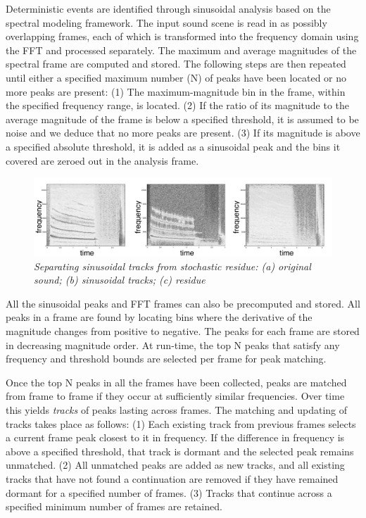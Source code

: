 \documentclass[twoside]{article}
\begin{document}
Deterministic events are identified through sinusoidal analysis based on the 
spectral modeling framework. The input sound scene is read in as possibly overlapping 
frames, each of which is transformed into the frequency domain using the 
FFT and processed separately. The maximum and average 
magnitudes of the spectral frame are computed and stored. The following 
steps are then repeated until either a specified maximum number (N) of peaks 
have been located or no more peaks are present:
(1) The maximum-magnitude bin in the frame, within the specified frequency range, is 
located. 
(2) If the ratio of its magnitude to the average magnitude of the frame is 
below a specified threshold, it is assumed to be noise and we deduce that no 
more peaks are present. 
(3) If its magnitude is above a specified absolute threshold, it is added as a 
sinusoidal peak and the bins it covered are zeroed out in the analysis frame.
\begin{figure}[t]
\setlength\textfloatsep{0pt}
\setlength\abovecaptionskip{0pt}
\setlength\belowcaptionskip{0pt}
\centering
   \includegraphics[width=.48\textwidth]{fireworksb.jpg}
\caption{\it Separating sinusoidal tracks from stochastic residue: (a) 
original sound; 
(b) sinusoidal tracks; (c) residue}
\label{fig:sines}
\end{figure}

All the sinusoidal peaks and FFT frames can also be precomputed and stored. 
All peaks in a frame are found by locating bins where the derivative of the magnitude changes from 
positive to negative. The peaks for each frame are stored in decreasing magnitude order.
At run-time, the top N peaks that satisfy any frequency and threshold 
bounds are selected per frame for peak matching. 

Once the top N peaks in all the frames have been collected, peaks are matched  
from frame to frame if they occur at sufficiently similar frequencies. 
Over time this yields \emph{tracks} of peaks lasting across frames. The 
matching and updating of tracks takes place as follows:
(1) Each existing track from previous frames selects a current frame peak 
closest to it in frequency. If the difference in 
frequency is above a specified threshold, that track is dormant 
and the selected peak remains unmatched. 
(2) All unmatched peaks are 
added as new tracks, and all existing tracks that have not found a 
continuation are removed if they have remained dormant for a specified 
number of frames. 
(3) Tracks that continue across a specified minimum number of frames are retained. 
\end{document}
